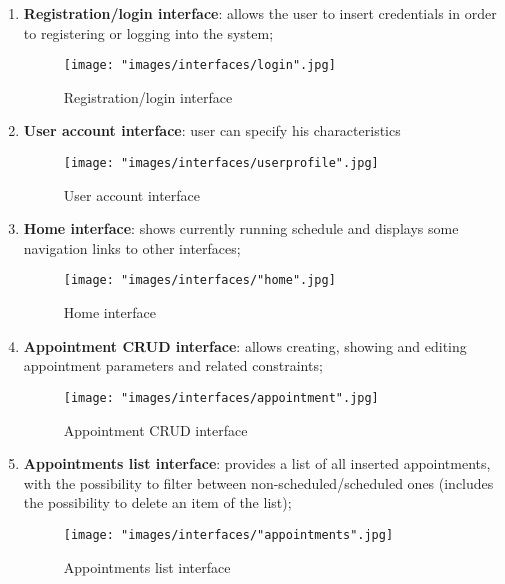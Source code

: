 \begin{enumerate}
\item \textbf{Registration/login interface}: allows the user to insert credentials in order to registering or logging into the system;
\begin{figure}[H]
\begin{center}
\texttt{[image: "images/interfaces/login".jpg]}
\caption{Registration/login interface}
\end{center}
\end{figure}

\item \textbf{User account interface}: user can specify his characteristics 
\begin{figure}[H]
\begin{center}
\texttt{[image: "images/interfaces/userprofile".jpg]}
\caption{User account interface}
\end{center}
\end{figure}

\item \textbf{Home interface}: shows currently running schedule and displays some navigation links to other interfaces;
\begin{figure}[H]
\begin{center}
\texttt{[image: "images/interfaces/"home".jpg]}
\caption{Home interface}
\end{center}
\end{figure}

\item \textbf{Appointment CRUD interface}: allows creating, showing and editing appointment parameters and related constraints;
\begin{figure}[H]
\begin{center}
\texttt{[image: "images/interfaces/appointment".jpg]}
\caption{Appointment CRUD interface}
\end{center}
\end{figure}

\item \textbf{Appointments list interface}: provides a list of all inserted appointments, with the possibility to filter between non-scheduled/scheduled ones (includes the possibility to delete an item of the list);
\begin{figure}[H]
\begin{center}
\texttt{[image: "images/interfaces/"appointments".jpg]}
\caption{Appointments list interface}
\end{center}
\end{figure}


\end{enumerate}
